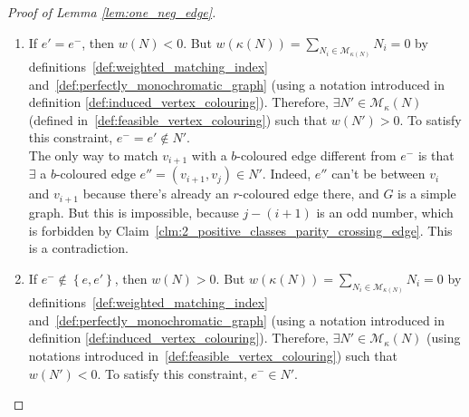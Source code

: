 \begin{proof}[Proof of Lemma \ref{lem:one_neg_edge}]
\begin{enumerate}
\begin{enumerate}
                The only way to match $v_i$ with a $b$-coloured edge different from $e^-$ is that $\exists$ a $b$-coloured edge $e'' = (v_i, v_k) \in N'$.
                Indeed, $e''$ can't be between $v_i$ and $v_{i+1}$ because there's already an $r$-coloured edge there, and $G$ is a simple graph.
                But this is impossible, because $k-i$ is an odd number, which is forbidden by Claim~\ref{clm:2_positive_classes_parity_crossing_edge}.
                This is a contradiction.

            \item If $e' = e^-$, then $w(N) < 0$.
                But $w(\kappa(N)) = \sum\limits_{N_i \in \mathcal{M}_{\kappa(N)}} N_i = 0$ by definitions~\ref{def:weighted_matching_index} and~\ref{def:perfectly_monochromatic_graph} (using a notation introduced in definition \ref{def:induced_vertex_colouring}).
                Therefore, $\exists N' \in \mathcal{M}_\kappa(N)$ (defined in~\ref{def:feasible_vertex_colouring}) such that $w(N') > 0$.
                To satisfy this constraint, $e^- = e' \notin N'$.\\

                The only way to match $v_{i+1}$ with a $b$-coloured edge different from $e^-$ is that $\exists$ a $b$-coloured edge $e'' = (v_{i+1}, v_j) \in N'$.
                Indeed, $e''$ can't be between $v_i$ and $v_{i+1}$ because there's already an $r$-coloured edge there, and $G$ is a simple graph.
                But this is impossible, because $j - (i+1)$ is an odd number, which is forbidden by Claim~\ref{clm:2_positive_classes_parity_crossing_edge}.
                This is a contradiction.

            \item If $e^- \notin \left\{ e, e' \right\}$, then $w(N) > 0$.
                But $w(\kappa(N)) = \sum\limits_{N_i \in \mathcal{M}_{\kappa(N)}} N_i = 0$ by definitions~\ref{def:weighted_matching_index} and~\ref{def:perfectly_monochromatic_graph} (using a notation introduced in definition \ref{def:induced_vertex_colouring}).
                Therefore, $\exists N' \in \mathcal{M}_\kappa(N)$ (using notations introduced in~\ref{def:feasible_vertex_colouring}) such that $w(N') < 0$.
                To satisfy this constraint, $e^- \in N'$.\\


\end{enumerate}
\end{enumerate}
\end{proof}
